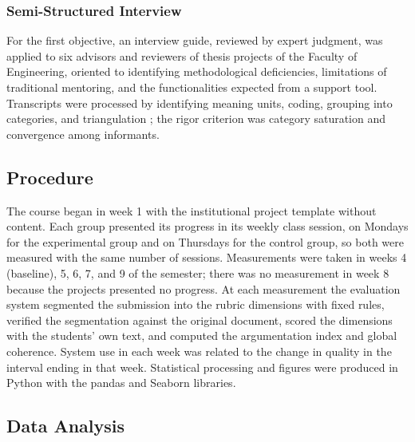 \documentclass[journal]{IEEEtran}
\begin{document}
\subsubsection{Semi-Structured Interview}
For the first objective, an interview guide, reviewed by expert judgment, was applied to six advisors and reviewers of thesis projects of the Faculty of Engineering, oriented to identifying methodological deficiencies, limitations of traditional mentoring, and the functionalities expected from a support tool. Transcripts were processed by identifying meaning units, coding, grouping into categories, and triangulation \cite{vives2021}; the rigor criterion was category saturation and convergence among informants.

\subsection{Procedure}

The course began in week 1 with the institutional project template without content. Each group presented its progress in its weekly class session, on Mondays for the experimental group and on Thursdays for the control group, so both were measured with the same number of sessions. Measurements were taken in weeks 4 (baseline), 5, 6, 7, and 9 of the semester; there was no measurement in week 8 because the projects presented no progress. At each measurement the evaluation system segmented the submission into the rubric dimensions with fixed rules, verified the segmentation against the original document, scored the dimensions with the students' own text, and computed the argumentation index and global coherence. System use in each week was related to the change in quality in the interval ending in that week. Statistical processing and figures were produced in Python with the pandas and Seaborn libraries.

\subsection{Data Analysis}
\end{document}
